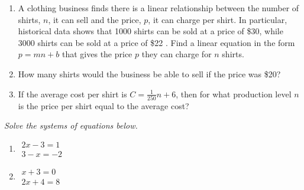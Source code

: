 \documentclass[10pt]{article}
\begin{document}
\begin{enumerate}
\setcounter{enumi}{\theenumCount}

\item A clothing business finds there is a linear relationship between the number of shirts, $n$, it can
sell and the price, $p$, it can charge per shirt. In particular, historical data shows that 1000
shirts can be sold at a price of \$30, while 3000 shirts can be sold at a price of \$22 . Find a
linear equation in the form $p = mn + b$ that gives the price $p$ they can charge for $n$ shirts.\vfill

\item How many shirts would the business be able to sell if the price was \$20? 
\vfill

\item If the average cost per shirt is $C = \tfrac{1}{250} n + 6$, then for what production level $n$ is the price per shirt equal to the average cost? 
\vfill
\setcounter{enumCount}{\theenumi}
\end{enumerate}


\noindent 
\textit{Solve the systems of equations below.}
\begin{multicols}{2}
\begin{enumerate}
\setcounter{enumi}{\theenumCount}
\item $\begin{array}{l} 2x - 3 = 1 \\ 3 - x = -2 \end{array}$ 
\item $\begin{array}{l} x + 3 = 0 \\ 2x + 4 = 8\end{array}$ 
\setcounter{enumCount}{\theenumi}
\end{enumerate}
\end{multicols}

\vfill
\end{document}
